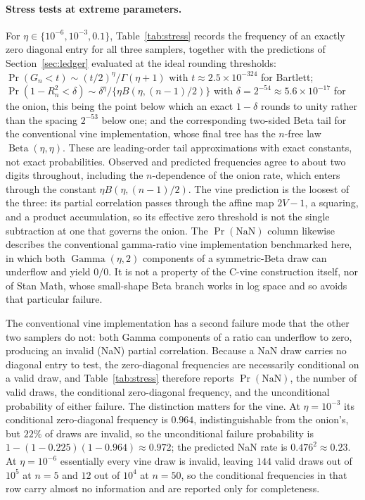 \documentclass[12pt,english]{article}
\theoremstyle{plain} %
\theoremstyle{definition} %
\theoremstyle{remark} %
\newcommand{\xsec}[2]{Section~\ref{#1}}
\begin{document}
\paragraph{Stress tests at extreme parameters.}
For $\eta\in\{10^{-6},10^{-3},0.1\}$, Table~\ref{tab:stress} records the frequency of an exactly zero diagonal entry for all three samplers, together with the predictions of \xsec{sec:ledger}{7} evaluated at the ideal rounding thresholds: $\Pr(G_n<t)\sim(t/2)^{\eta}/\Gamma(\eta+1)$ with $t\approx2.5\times10^{-324}$ for Bartlett; $\Pr(1-R_n^2<\delta)\sim\delta^{\eta}/\{\eta B(\eta,(n-1)/2)\}$ with $\delta=2^{-54}\approx5.6\times10^{-17}$ for the onion, this being the point below which an exact $1-\delta$ rounds to unity rather than the spacing $2^{-53}$ below one; and the corresponding two-sided Beta tail for the conventional vine implementation, whose final tree has the $n$-free law $\operatorname{Beta}(\eta,\eta)$. These are leading-order tail approximations with exact constants, not exact probabilities. Observed and predicted frequencies agree to about two digits throughout, including the $n$-dependence of the onion rate, which enters through the constant $\eta B(\eta,(n-1)/2)$. The vine prediction is the loosest of the three: its partial correlation passes through the affine map $2V-1$, a squaring, and a product accumulation, so its effective zero threshold is not the single subtraction at one that governs the onion. The $\Pr(\mathrm{NaN})$ column likewise describes the conventional gamma-ratio vine implementation benchmarked here, in which both $\operatorname{Gamma}(\eta,2)$ components of a symmetric-Beta draw can underflow and yield $0/0$. It is not a property of the C-vine construction itself, nor of Stan Math, whose small-shape Beta branch works in log space and so avoids that particular failure.

The conventional vine implementation has a second failure mode that the other two samplers do not: both Gamma components of a ratio can underflow to zero, producing an invalid (NaN) partial correlation. Because a NaN draw carries no diagonal entry to test, the zero-diagonal frequencies are necessarily conditional on a valid draw, and Table~\ref{tab:stress} therefore reports $\Pr(\mathrm{NaN})$, the number of valid draws, the conditional zero-diagonal frequency, and the unconditional probability of either failure. The distinction matters for the vine. At $\eta=10^{-3}$ its conditional zero-diagonal frequency is $0.964$, indistinguishable from the onion's, but $22\%$ of draws are invalid, so the unconditional failure probability is $1-(1-0.225)(1-0.964)\approx0.972$; the predicted NaN rate is $0.476^2\approx0.23$. At $\eta=10^{-6}$ essentially every vine draw is invalid, leaving $144$ valid draws out of $10^5$ at $n=5$ and $12$ out of $10^4$ at $n=50$, so the conditional frequencies in that row carry almost no information and are reported only for completeness.
\end{document}
